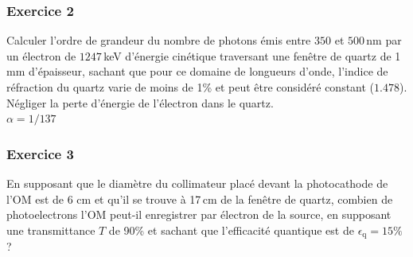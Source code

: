 
\subsubsection{Exercice 2}
Calculer l'ordre de grandeur du nombre de photons émis entre $350$ et $500$\,nm par un électron de $1247$\,keV d'énergie cinétique traversant une fenêtre de quartz de 1\,mm d'épaisseur, sachant que pour ce domaine de longueurs d’onde, l'indice de réfraction du quartz varie de moins de 1\% et peut être considéré constant ($1.478$). Négliger la perte d'énergie de l'électron dans le quartz.\\ $\alpha = 1/137$


\subsubsection{Exercice 3}
En supposant que le diamètre du collimateur placé devant la photocathode de l'OM est de 6 cm et qu'il se trouve à 17\,cm de la fenêtre de quartz, combien de photoelectrons l'OM peut-il enregistrer par électron de la source, en supposant une transmittance $T$ de 90\% et sachant que l'efficacité quantique est de $\epsilon_\mathrm{q}=15\%$?

